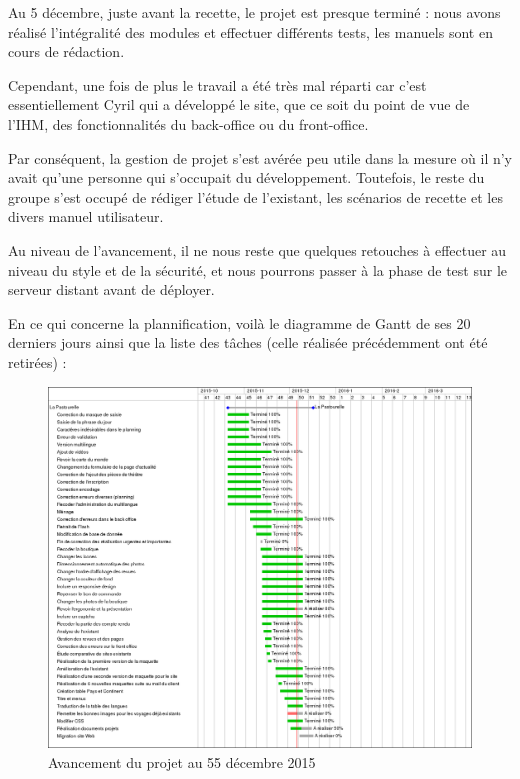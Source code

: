 \documentclass[11pt]{report}
\begin{document}
\par Au 5 décembre, juste avant la recette, le projet est presque terminé : nous
avons réalisé l'intégralité des modules et effectuer différents tests, les
manuels sont en cours de rédaction. \\
\par Cependant, une fois de plus le travail a été très mal réparti car c'est
essentiellement Cyril qui a développé le site, que ce soit du point de vue de
l'IHM, des fonctionnalités du back-office ou du front-office. \\
\par Par conséquent, la gestion de projet s'est avérée peu utile dans la mesure
où il n'y avait qu'une personne qui s'occupait du développement. Toutefois, le
reste du groupe s'est occupé de rédiger l'étude de l'existant, les scénarios de
recette et les divers manuel utilisateur.\\
\par Au niveau de l'avancement, il ne nous reste que quelques retouches à
effectuer au niveau du style et de la sécurité, et nous pourrons passer à la
phase de test sur le serveur distant avant de déployer.\\
\par En ce qui concerne la plannification, voilà le diagramme de Gantt de ses 20
derniers jours ainsi que la liste des tâches (celle réalisée précédemment ont
été retirées) :


\begin{landscape}
\begin{figure}[t]
    \caption{Avancement du projet au 55 décembre 2015}
   \includegraphics[scale=0.5]{include/gantt5-12.png}
\end{figure}
\end{landscape}
\end{document}
